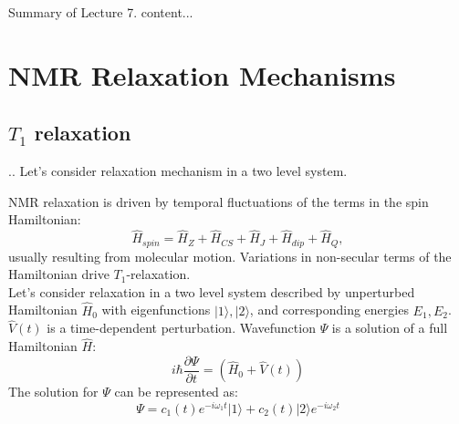 \documentclass[handout]{beamer}
\begin{document}
\begin{frame}{Summary of Lecture 7.}
	content...
\end{frame}

\section{NMR Relaxation Mechanisms}
\subsection{$T_1$ relaxation}

\begin{frame}{\thesection.\thesubsection. \insertsubsection}
  Let's consider relaxation mechanism in a two level system. 	
	
   NMR relaxation is driven by temporal fluctuations of the terms in the spin Hamiltonian:
   \begin{equation}
     \hat{H}_{spin} = \hat{H}_Z + \hat{H}_{CS} + \hat{H}_J + \hat{H}_{dip} + \hat{H}_Q, 
   \end{equation} 
   usually resulting from molecular motion. Variations in non-secular terms of the Hamiltonian drive $T_1$-relaxation. \\
    Let's consider relaxation in a two level system described by unperturbed Hamiltonian $\hat{H}_0$ with eigenfunctions $\vert 1 \rangle, \vert 2 \rangle$, and corresponding energies $E_1, E_2$. $\hat{V}(t)$ is a time-dependent perturbation. Wavefunction $\Psi$ is a solution of a full Hamiltonian $\hat{H}$:
    \begin{equation} \label{eq: relaxation_Schredinger}
       i\hbar \dfrac{ \partial \Psi}{\partial t} = (\hat{H}_0 + \hat{V}(t))
    \end{equation}
    The solution for $\Psi$ can be represented as:
    \begin{equation} \label{eq: relaxation_Psi}
       \Psi = c_1(t) e^{-i \omega_1 t} \vert 1 \rangle + c_2(t) \vert 2 \rangle e^{-i \omega_2 t}
    \end{equation}
  
\end{frame}
\end{document}
